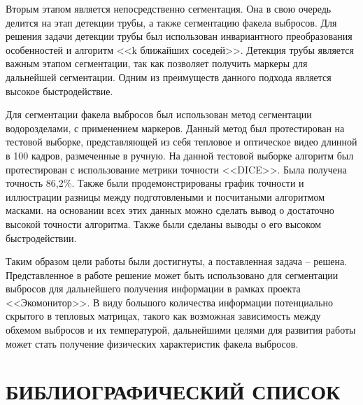 \documentclass[14pt, a4paper]{extreport}
\begin{document}
	Вторым этапом является непосредственно сегментация. Она в свою очередь делится на этап детекции трубы, а также сегментацию факела выбросов. Для решения задачи детекции трубы был использован инвариантного преобразования особенностей и алгоритм <<k ближайших соседей>>. Детекция трубы является важным этапом сегментации, так как позволяет получить маркеры для дальнейшей сегментации. Одним из преимуществ данного подхода является высокое быстродействие.
	
	Для сегментации факела выбросов был использован метод сегментации водорозделами, с применением маркеров. Данный метод был протестирован на тестовой выборке, представляющей из себя тепловое и оптическое видео длинной в 100 кадров, размеченные в ручную. На данной тестовой выборке алгоритм был протестирован с использование метрики точности <<DICE>>. Была получена точность 86,2\%. Также были продемонстрированы график точности и иллюстрации разницы между подготовлеными и посчитаными алгоритмом масками. на основании всех этих данных можно сделать вывод о достаточно высокой точности алгоритма. Также были сделаны выводы о его высоком быстродействии.
	
	Таким образом цели работы были достигнуты, а поставленная задача -- решена. Представленное в работе решение может быть использовано для сегментации выбросов для дальнейшего получения информации в рамках проекта <<Экомонитор>>. В виду большого количества информации потенциально скрытого в тепловых матрицах, такого как возможная зависимость между обхемом выбросов и их температурой, дальнейшими целями для развития работы может стать получение физических характеристик факела выбросов.
	
	
\chapter*{БИБЛИОГРАФИЧЕСКИЙ СПИСОК}
	
\end{document}
